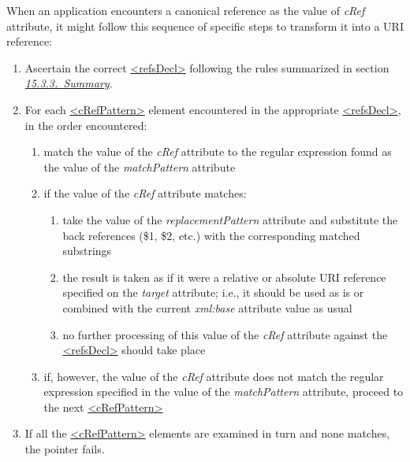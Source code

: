 When an application encounters a canonical reference as the value of {\itshape cRef} attribute, it might follow this sequence of specific steps to transform it into a URI reference: \begin{enumerate}
\item Ascertain the correct \hyperref[TEI.refsDecl]{<refsDecl>} following the rules summarized in section \textit{\hyperref[CCAS3]{15.3.3.\ Summary}}.
\item For each \hyperref[TEI.cRefPattern]{<cRefPattern>} element encountered in the appropriate \hyperref[TEI.refsDecl]{<refsDecl>}, in the order encountered: \mbox{}\\[-10pt] \begin{enumerate}
\item match the value of the {\itshape cRef} attribute to the regular expression found as the value of the {\itshape matchPattern} attribute
\item if the value of the {\itshape cRef} attribute matches: \mbox{}\\[-10pt] \begin{enumerate}
\item take the value of the {\itshape replacementPattern} attribute and substitute the back references (\$1, \$2, etc.) with the corresponding matched substrings
\item the result is taken as if it were a relative or absolute URI reference specified on the {\itshape target} attribute; i.e., it should be used as is or combined with the current {\itshape xml:base} attribute value as usual
\item no further processing of this value of the {\itshape cRef} attribute against the \hyperref[TEI.refsDecl]{<refsDecl>} should take place
\end{enumerate}
\item if, however, the value of the {\itshape cRef} attribute does not match the regular expression specified in the value of the {\itshape matchPattern} attribute, proceed to the next \hyperref[TEI.cRefPattern]{<cRefPattern>}
\end{enumerate}
\item If all the \hyperref[TEI.cRefPattern]{<cRefPattern>} elements are examined in turn and none matches, the pointer fails.
\end{enumerate}\par
